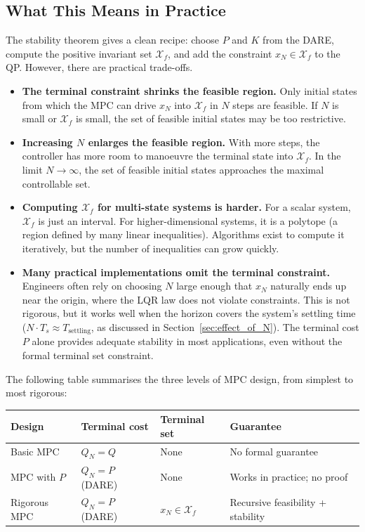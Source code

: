 \subsection{What This Means in Practice}

The stability theorem gives a clean recipe: choose $P$ and $K$ from the DARE, compute the positive invariant set $\mathcal{X}_f$, and add the constraint $x_N \in \mathcal{X}_f$ to the QP. However, there are practical trade-offs.

\begin{itemize}
	\item \textbf{The terminal constraint shrinks the feasible region.} Only initial states from which the MPC can drive $x_N$ into $\mathcal{X}_f$ in $N$ steps are feasible. If $N$ is small or $\mathcal{X}_f$ is small, the set of feasible initial states may be too restrictive.

	\item \textbf{Increasing $N$ enlarges the feasible region.} With more steps, the controller has more room to manoeuvre the terminal state into $\mathcal{X}_f$. In the limit $N \to \infty$, the set of feasible initial states approaches the maximal controllable set.

	\item \textbf{Computing $\mathcal{X}_f$ for multi-state systems is harder.} For a scalar system, $\mathcal{X}_f$ is just an interval. For higher-dimensional systems, it is a polytope (a region defined by many linear inequalities). Algorithms exist to compute it iteratively, but the number of inequalities can grow quickly.

	\item \textbf{Many practical implementations omit the terminal constraint.} Engineers often rely on choosing $N$ large enough that $x_N$ naturally ends up near the origin, where the LQR law does not violate constraints. This is not rigorous, but it works well when the horizon covers the system's settling time ($N \cdot T_s \approx T_{\text{settling}}$, as discussed in Section~\ref{sec:effect_of_N}). The terminal cost $P$ alone provides adequate stability in most applications, even without the formal terminal set constraint.
\end{itemize}

The following table summarises the three levels of MPC design, from simplest to most rigorous:

\begin{center}
\begin{tabular}{L{3.5cm} C{2.5cm} C{2.5cm} C{3.5cm}}
	\toprule
	\textbf{Design} & \textbf{Terminal cost} & \textbf{Terminal set} & \textbf{Guarantee} \\
	\midrule
	Basic MPC & $Q_N = Q$ & None & No formal guarantee \\
	MPC with $P$ & $Q_N = P$ (DARE) & None & Works in practice; no proof \\
	Rigorous MPC & $Q_N = P$ (DARE) & $x_N \in \mathcal{X}_f$ & Recursive feasibility + stability \\
	\bottomrule
\end{tabular}
\end{center}

